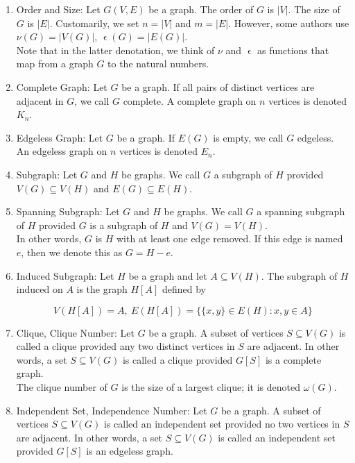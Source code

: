 \documentclass{article}
\begin{document}
\begin{enumerate}
		\item Order and Size: Let $G(V,E)$ be a graph.
		The order of $G$ is $|V|$.
		The size of $G$ is $|E|$.
		Customarily, we set $n=|V|$ and $m=|E|$.
		However, some authors use $\nu(G)=|V(G)|$, $\upvarepsilon(G)=|E(G)|$.\\
		
		Note that in the latter denotation, we think of $\nu$ and $\upvarepsilon$ as functions that map from a graph $G$ to the natural numbers.
		
		\item Complete Graph: Let $G$ be a graph.
		If all pairs of distinct vertices are adjacent in $G$, we call $G$ complete.
		A complete graph on $n$ vertices is denoted $K_n$.
		
		\item Edgeless Graph: Let $G$ be a graph.
		If $E(G)$ is empty, we call $G$ edgeless.
		An edgeless graph on $n$ vertices is denoted $E_n$.
		
		\item Subgraph: Let $G$ and $H$ be graphs.
		We call $G$ a subgraph of $H$ provided $V(G)\subseteq V(H)$ and $E(G)\subseteq E(H)$.
		
		\item Spanning Subgraph: Let $G$ and $H$ be graphs.
		We call $G$ a spanning subgraph of $H$ provided $G$ is a subgraph of $H$ and $V(G)=V(H)$.\\
		
		In other words, $G$ is $H$ with at least one edge removed.
		If this edge is named $e$, then we denote this as $G=H-e$.
		
		\item Induced Subgraph: Let $H$ be a graph and let $A\subseteq V(H)$.
		The subgraph of $H$ induced on $A$ is the graph $H[A]$ defined by
		
		\[V(H[A])=A, \: E(H[A])=\{\{x,y\}\in E(H): x,y\in A\}\]
		
		\item Clique, Clique Number: Let $G$ be a graph.
		A subset of vertices $S\subseteq V(G)$ is called a clique provided any two distinct vertices in $S$ are adjacent.
		In other words, a set $S\subseteq V(G)$ is called a clique provided $G[S]$ is a complete graph.\\
		
		The clique number of $G$ is the size of a largest clique;
		it is denoted $\omega (G)$.
		
		\item Independent Set, Independence Number: Let $G$ be a graph.
		A subset of vertices $S\subseteq V(G)$ is called an independent set provided no two vertices in $S$ are adjacent.
		In other words, a set $S\subseteq V(G)$ is called an independent set provided $G[S]$ is an edgeless graph.\\
		

\end{enumerate}
\end{document}
